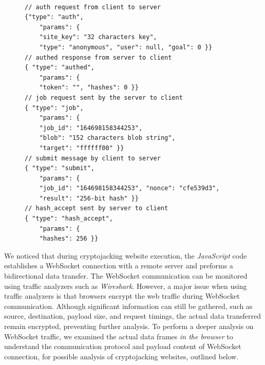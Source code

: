 \documentclass[acmlarge]{acmart}
\newcommand{\vs}[1]{{\vspace{-#1mm}}}
\newcommand{\js}{{\em JavaScript}\xspace}
\newcommand{\cj}{cryptojacking\xspace}
\begin{document}
\begin{figure}[t]
\begin{lstlisting}[caption={WebSocket frames exchanged},label={lst:auth}, style=json]%[t]

// auth request from client to server 
{"type": "auth",
    "params": {
    "site_key": "32 characters key",
    "type": "anonymous", "user": null, "goal": 0 }}
// authed response from server to client    
{ "type": "authed",
	"params": {
	"token": "", "hashes": 0 }}
// job request sent by the server to client	
{ "type": "job",
	"params": {
	"job_id": "164698158344253",
	"blob": "152 characters blob string",
	"target": "ffffff00" }}
// submit message by client to server
{ "type": "submit",
	"params": {
	"job_id": "164698158344253", "nonce": "cfe539d3",
	"result": "256-bit hash" }}
// hash_accept sent by server to client
{ "type": "hash_accept",
	"params": {
	"hashes": 256 }}

\end{lstlisting}
\end{figure}













We noticed that during \cj website execution, the \js code establishes a WebSocket connection with a remote server and preforms a bidirectional data transfer. The WebSocket communication can be monitored using traffic analyzers such as {\em Wireshark}. However, a major issue when using traffic analyzers is that browsers encrypt the web traffic during WebSocket communication. Although significant information can still be gathered, such as source, destination, payload size, and request timings, the actual data transferred remain encrypted, preventing further analysis. To perform a deeper analysis on WebSocket traffic, we examined the actual data frames {\em in the browser} to understand the communication protocol and payload content of WebSocket connection, for possible analysis of \cj websites, outlined below. 
\end{document}
